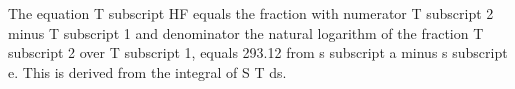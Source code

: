 The equation T subscript HF equals the fraction with numerator T subscript 2 minus T subscript 1 and denominator the natural logarithm of the fraction T subscript 2 over T subscript 1, equals 293.12 from s subscript a minus s subscript e. This is derived from the integral of S T ds.